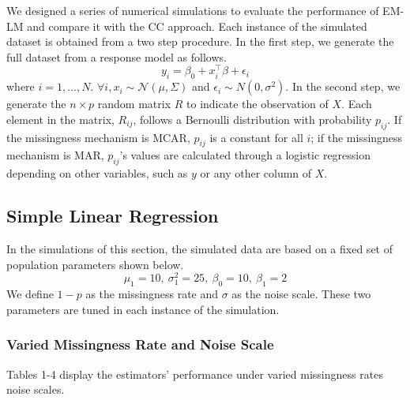 \documentclass[
  twocolumn]{article}
\begin{document}
We designed a series of numerical simulations to evaluate the
performance of EM-LM and compare it with the CC approach. Each instance
of the simulated dataset is obtained from a two step procedure. In the
first step, we generate the full dataset from a response model as
follows. \[
y_i = \beta_0 + x_{i}^{\top}\beta + \epsilon_i
\] where \(i = 1,...,N\).
\(\forall i, x_i \sim \mathcal{N}(\mu, \Sigma)\) and
\(\epsilon_i \sim N(0, \sigma^2)\). In the second step, we generate the
\(n \times p\) random matrix \(R\) to indicate the observation of \(X\).
Each element in the matrix, \(R_{ij}\), follows a Bernoulli distribution
with probability \(p_{ij}\). If the missingness mechanism is MCAR,
\(p_{ij}\) is a constant for all \(i\); if the missingness mechanism is
MAR, \(p_{ij}\)'s values are calculated through a logistic regression
depending on other variables, such as \(y\) or any other column of
\(X\).

\hypertarget{simple-linear-regression}{%
\subsection{Simple Linear Regression}\label{simple-linear-regression}}

In the simulations of this section, the simulated data are based on a
fixed set of population parameters shown below. \[
\mu_1 = 10,~\sigma_{1}^{2} = 25,~\beta_0 = 10,~\beta_1 = 2
\] We define \(1 - p\) as the missingness rate and \(\sigma\) as the
noise scale. These two parameters are tuned in each instance of the
simulation.

\hypertarget{varied-missingness-rate-and-noise-scale}{%
\subsubsection{Varied Missingness Rate and Noise
Scale}\label{varied-missingness-rate-and-noise-scale}}

Tables 1-4 display the estimators' performance under varied missingness
rates noise scales.
\end{document}
